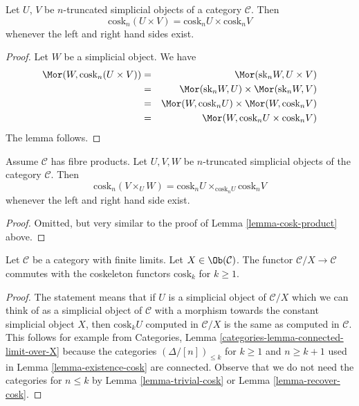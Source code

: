 \begin{lemma}
\label{lemma-cosk-product}
Let $U$, $V$ be $n$-truncated simplicial objects of a
category $\mathcal{C}$. Then
$$
\text{cosk}_n (U \times V) = \text{cosk}_nU \times \text{cosk}_nV
$$
whenever the left and right hand sides exist.
\end{lemma}

\begin{proof}
Let $W$ be a simplicial object. We have
\begin{eqnarray*}
\Mor(W, \text{cosk}_n (U \times V))
& = &
\Mor(\text{sk}_n W, U \times V) \\
& = &
\Mor(\text{sk}_n W, U)
\times
\Mor(\text{sk}_nW, V) \\
& = &
\Mor(W, \text{cosk}_n U)
\times
\Mor(W, \text{cosk}_n V) \\
& = &
\Mor(W, \text{cosk}_n U \times \text{cosk}_n V)
\end{eqnarray*}
The lemma follows.
\end{proof}

\begin{lemma}
\label{lemma-cosk-fibre-product}
Assume $\mathcal{C}$ has fibre products.
Let $U, V, W$ be $n$-truncated simplicial objects of the
category $\mathcal{C}$. Then
$$
\text{cosk}_n (V \times_U W)
=
\text{cosk}_nU \times_{\text{cosk}_n U} \text{cosk}_nV
$$
whenever the left and right hand side exist.
\end{lemma}

\begin{proof}
Omitted, but very similar to the proof of
Lemma \ref{lemma-cosk-product} above.
\end{proof}

\begin{lemma}
\label{lemma-cosk-above-object}
Let $\mathcal{C}$ be a category with finite limits.
Let $X \in \Ob(\mathcal{C})$.
The functor $\mathcal{C}/X \to \mathcal{C}$ commutes with
the coskeleton functors $\text{cosk}_k$ for $k \geq 1$.
\end{lemma}

\begin{proof}
The statement means that if $U$ is a simplicial object of $\mathcal{C}/X$
which we can think of as a simplicial object of $\mathcal{C}$ with a morphism
towards the constant simplicial object $X$, then $\text{cosk}_k U$
computed in $\mathcal{C}/X$ is the same as computed in $\mathcal{C}$.
This follows for example from
Categories, Lemma \ref{categories-lemma-connected-limit-over-X}
because the categories $(\Delta/[n])_{\leq k}$ for $k \geq 1$ and
$n \geq k + 1$ used in Lemma \ref{lemma-existence-cosk}
are connected. Observe that we do not need the categories
for $n \leq k$ by Lemma \ref{lemma-trivial-cosk} or
Lemma \ref{lemma-recover-cosk}.
\end{proof}

